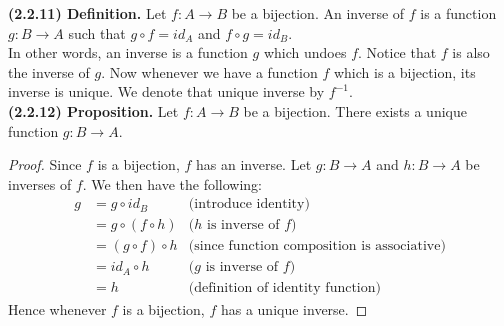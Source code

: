 \documentclass[12pt]{book}
\begin{document}
\noindent\textbf{(2.2.11) Definition.} Let $f\colon A\rightarrow B$ be a bijection. An inverse of $f$ is a function $g\colon B\rightarrow A$ such that $g\circ f=id_A$ and $f\circ g=id_B$. \\

In other words, an inverse is a function $g$ which undoes $f$. Notice that $f$ is also the inverse of $g$. Now whenever we have a function $f$ which is a bijection, its inverse is unique. We denote that unique inverse by $f^{-1}$.\\

\noindent\textbf{(2.2.12) Proposition.} Let $f\colon A\rightarrow B$ be a bijection. There exists a unique function $g\colon B\rightarrow A$.
\begin{proof}
Since $f$ is a bijection, $f$ has an inverse. Let $g\colon B\rightarrow A$ and $h\colon B\rightarrow A$ be inverses of $f$. We then have the following:
\begin{align*}
g & = g\circ id_B &\text{(introduce identity)}\\ 
 & = g\circ(f\circ h) & \text{($h$ is inverse of $f$)}\\
 & = (g\circ f)\circ h & \text{(since function composition is associative)}\\
 & = id_A\circ h & \text{($g$ is inverse of $f$)}\\
 & = h & \text{(definition of identity function)}
\end{align*}
Hence whenever $f$ is a bijection, $f$ has a unique inverse.
\end{proof}
\end{document}
